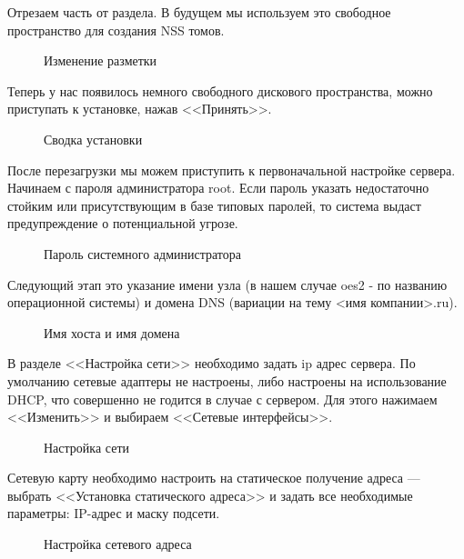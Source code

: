 Отрезаем часть от раздела. В будущем мы используем это свободное пространство для создания NSS томов.
\begin{figure}[H]
\caption{Изменение разметки}
\label{p4}
\end{figure}
\clearpage

Теперь у нас появилось немного свободного дискового пространства, можно приступать к установке, нажав <<Принять>>.
\begin{figure}[H]
\caption{Сводка установки}
\label{p5}
\end{figure}
\clearpage

После перезагрузки мы можем приступить к первоначальной настройке сервера.\\
Начинаем с пароля администратора root. Если пароль указать недостаточно стойким или присутствующим в базе типовых паролей, то система выдаст предупреждение о потенциальной угрозе.
\begin{figure}[H]
\caption{Пароль системного администратора}
\label{fig6}
\end{figure}
\clearpage

Следующий этап это указание имени узла (в нашем случае oes2 - по названию операционной системы) и домена DNS (вариации на тему <имя компании>.ru).
\begin{figure}[H]
\caption{Имя хоста и имя домена}
\label{fig7}
\end{figure}
\clearpage

В разделе <<Настройка сети>> необходимо задать ip адрес сервера. По умолчанию сетевые адаптеры не настроены, либо настроены на использование DHCP, что совершенно не годится в случае с сервером. Для этого нажимаем <<Изменить>> и выбираем <<Сетевые интерфейсы>>.
\begin{figure}[H]
\caption{Настройка сети}
\label{figNetworkall}
\end{figure}
\clearpage

Сетевую карту необходимо настроить на статическое получение адреса — выбрать <<Установка статического адреса>> и задать все необходимые параметры: IP-адрес и маску подсети.
\begin{figure}[H]
\caption{Настройка сетевого адреса}
\label{fig8}
\end{figure}
\clearpage

